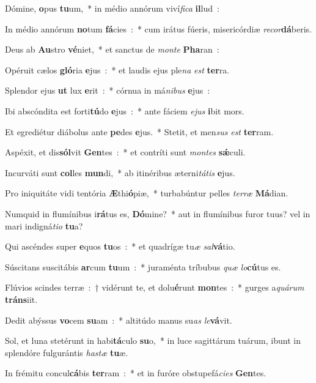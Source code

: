 ﻿\item Dómine, \textbf{o}pus \textbf{tu}um,~* in médio annórum viví\emph{fi}\emph{ca} \textbf{il}lud~:
\item In médio annórum \textbf{no}tum \textbf{fá}cies~:~* cum irátus fúeris, misericórdiæ \emph{re}\emph{cor}\textbf{dá}beris.
\item Deus ab \textbf{Au}stro \textbf{vé}niet,~* et sanctus de \emph{mon}\emph{te} \textbf{Pha}ran~:
\item Opéruit cælos \textbf{gló}ria \textbf{e}jus~:~* et laudis ejus ple\emph{na} \emph{est} \textbf{ter}ra.
\item Splendor ejus \textbf{ut} lux \textbf{e}rit~:~* córnua in má\emph{ni}\emph{bus} \textbf{e}jus~:
\item Ibi abscóndita est forti\textbf{tú}do \textbf{e}jus~:~* ante fáciem \emph{e}\emph{jus} \textbf{i}bit mors.
\item Et egrediétur diábolus ante \textbf{pe}des \textbf{e}jus.~* Stetit, et men\emph{sus} \emph{est} \textbf{ter}ram.
\item Aspéxit, et dis\textbf{sól}vit \textbf{Gen}tes~:~* et contríti sunt \emph{mon}\emph{tes} \textbf{sǽ}culi.
\item Incurváti sunt \textbf{col}les \textbf{mun}di,~* ab itinéribus æterni\emph{tá}\emph{tis} \textbf{e}jus.
\item Pro iniquitáte vidi tentória \textbf{Æ}thi\textbf{ó}piæ,~* turbabúntur pelles \emph{ter}\emph{ræ} \textbf{Má}dian.
\item Numquid in flumínibus i\textbf{rá}tus es, \textbf{Dó}mine?~* aut in flumínibus furor tuus? vel in mari indigná\emph{ti}\emph{o} \textbf{tu}a?
\item Qui ascéndes super \textbf{e}quos \textbf{tu}os~:~* et quadrígæ tu\emph{æ} \emph{sal}\textbf{vá}tio.
\item Súscitans suscitábis \textbf{ar}cum \textbf{tu}um~:~* juraménta tríbubus \emph{quæ} \emph{lo}\textbf{cú}tus es.
\item Flúvios scindes terræ~:~† vidérunt te, et dolu\textbf{é}runt \textbf{mon}tes~:~* gurges a\emph{quá}\emph{rum} \textbf{tráns}iit.
\item Dedit abýssus \textbf{vo}cem \textbf{su}am~:~* altitúdo manus su\emph{as} \emph{le}\-\textbf{vá}\-vit.
\item Sol, et luna stetérunt in habi\textbf{tá}culo \textbf{su}o,~* in luce sagittárum tuárum, ibunt in splendóre fulgurántis \emph{ha}\emph{stæ} \textbf{tu}æ.
\item In frémitu concul\textbf{cá}bis \textbf{ter}ram~:~* et in furóre obstupefá\emph{ci}\emph{es} \textbf{Gen}tes.
